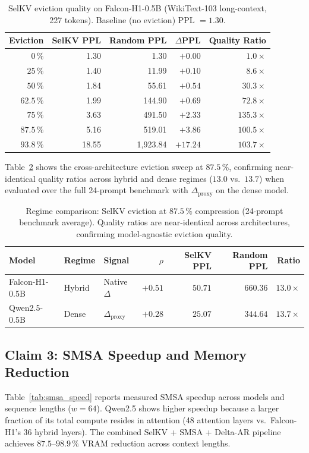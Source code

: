 \documentclass[11pt]{article}
\newcommand{\dsig}{\Delta}
\newcommand{\proxydsig}{\ensuremath{\dsig_{\mathrm{proxy}}}}
\begin{document}
\begin{table}[H]
\centering
\small
\caption{SelKV eviction quality on Falcon-H1-0.5B (WikiText-103
         long-context, 227 tokens). Baseline (no eviction) PPL $=1.30$.}
\label{tab:selkv}
\begin{tabular}{rrrrr}
\toprule
Eviction & SelKV PPL & Random PPL & $\Delta$PPL & Quality Ratio \\
\midrule
$0\,\%$    &  1.30 &     1.30 & $+0.00$  & $1.0\!\times$ \\
$25\,\%$   &  1.40 &    11.99 & $+0.10$  & $8.6\!\times$ \\
$50\,\%$   &  1.84 &    55.61 & $+0.54$  & $30.3\!\times$ \\
$62.5\,\%$ &  1.99 &   144.90 & $+0.69$  & $72.8\!\times$ \\
$75\,\%$   &  3.63 &   491.50 & $+2.33$  & $135.3\!\times$ \\
$87.5\,\%$ &  5.16 &   519.01 & $+3.86$  & $\mathbf{100.5\!\times}$ \\
$93.8\,\%$ & 18.55 & 1{,}923.84 & $+17.24$ & $103.7\!\times$ \\
\bottomrule
\end{tabular}
\end{table}

Table~\ref{tab:regime} shows the cross-architecture eviction sweep at
$87.5\,\%$, confirming near-identical quality ratios across hybrid and
dense regimes ($13.0$ vs.\ $13.7$) when evaluated over the full 24-prompt
benchmark with $\proxydsig$ on the dense model.

\begin{table}[H]
\centering
\small
\caption{Regime comparison: SelKV eviction at $87.5\,\%$ compression
         (24-prompt benchmark average). Quality ratios are near-identical
         across architectures, confirming model-agnostic eviction quality.}
\label{tab:regime}
\begin{tabular}{lllrrrr}
\toprule
Model & Regime & Signal & $\rho$ & SelKV PPL & Random PPL & Ratio \\
\midrule
Falcon-H1-0.5B & Hybrid & Native $\dsig$   & $+0.51$ & $50.71$ & $660.36$ & $13.0\!\times$ \\
Qwen2.5-0.5B   & Dense  & $\proxydsig$     & $+0.28$ & $25.07$ & $344.64$ & $13.7\!\times$ \\
\bottomrule
\end{tabular}
\end{table}

\subsection{Claim 3: SMSA Speedup and Memory Reduction}
Table~\ref{tab:smsa_speed} reports measured SMSA speedup across models and
sequence lengths ($w{=}64$). Qwen2.5 shows higher speedup because a larger
fraction of its total compute resides in attention (48 attention layers vs.\
Falcon-H1's 36 hybrid layers). The combined SelKV + SMSA + Delta-AR
pipeline achieves $87.5$--$98.9\,\%$ VRAM reduction across context lengths.
\end{document}
